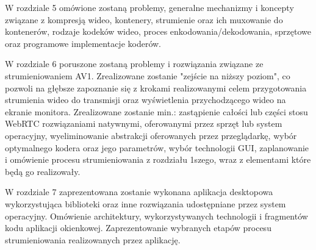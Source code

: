 W rozdziale 5 omówione zostaną problemy, generalne mechanizmy i koncepty związane z kompresją wideo, kontenery,
strumienie oraz ich muxowanie do kontenerów, rodzaje kodeków wideo, proces enkodowania/dekodowania, sprzętowe oraz
programowe implementacje koderów.

W rozdziale 6 poruszone zostaną problemy i rozwiązania związane ze strumieniowaniem AV1. Zrealizowane zostanie "zejście
na niższy poziom", co pozwoli na głębsze zapoznanie się z krokami realizowanymi celem przygotowania strumienia wideo do
transmisji oraz wyświetlenia przychodzącego wideo na ekranie monitora. Zrealizowane zostanie min.: zastąpienie całości
lub części stosu WebRTC rozwiązaniami natywnymi, oferowanymi przez sprzęt lub system operacyjny, wyeliminowanie
abstrakcji oferowanych przez przeglądarkę, wybór optymalnego kodera oraz jego parametrów, wybór technologii GUI,
zaplanowanie i omówienie procesu strumieniowania z rozdziału 1szego, wraz z elementami które będą go realizowały.

W rozdziale 7 zaprezentowana zostanie wykonana aplikacja desktopowa wykorzystująca biblioteki oraz inne rozwiązania
udostępniane przez system operacyjny. Omówienie architektury, wykorzystywanych technologii i fragmentów kodu aplikacji
okienkowej. Zaprezentowanie wybranych etapów procesu strumieniowania realizowanych przez aplikację.
